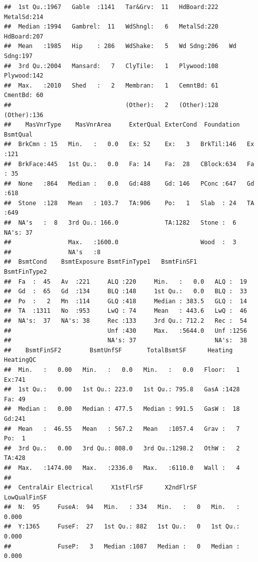 \documentclass[
]{article}
\begin{document}
\begin{verbatim}
##  1st Qu.:1967   Gable  :1141   Tar&Grv:  11   HdBoard:222   MetalSd:214  
##  Median :1994   Gambrel:  11   WdShngl:   6   MetalSd:220   HdBoard:207  
##  Mean   :1985   Hip    : 286   WdShake:   5   Wd Sdng:206   Wd Sdng:197  
##  3rd Qu.:2004   Mansard:   7   ClyTile:   1   Plywood:108   Plywood:142  
##  Max.   :2010   Shed   :   2   Membran:   1   CemntBd: 61   CmentBd: 60  
##                                (Other):   2   (Other):128   (Other):136  
##    MasVnrType    MasVnrArea     ExterQual ExterCond  Foundation  BsmtQual  
##  BrkCmn : 15   Min.   :   0.0   Ex: 52    Ex:   3   BrkTil:146   Ex  :121  
##  BrkFace:445   1st Qu.:   0.0   Fa: 14    Fa:  28   CBlock:634   Fa  : 35  
##  None   :864   Median :   0.0   Gd:488    Gd: 146   PConc :647   Gd  :618  
##  Stone  :128   Mean   : 103.7   TA:906    Po:   1   Slab  : 24   TA  :649  
##  NA's   :  8   3rd Qu.: 166.0             TA:1282   Stone :  6   NA's: 37  
##                Max.   :1600.0                       Wood  :  3             
##                NA's   :8                                                   
##  BsmtCond    BsmtExposure BsmtFinType1   BsmtFinSF1     BsmtFinType2
##  Fa  :  45   Av  :221     ALQ :220     Min.   :   0.0   ALQ :  19   
##  Gd  :  65   Gd  :134     BLQ :148     1st Qu.:   0.0   BLQ :  33   
##  Po  :   2   Mn  :114     GLQ :418     Median : 383.5   GLQ :  14   
##  TA  :1311   No  :953     LwQ : 74     Mean   : 443.6   LwQ :  46   
##  NA's:  37   NA's: 38     Rec :133     3rd Qu.: 712.2   Rec :  54   
##                           Unf :430     Max.   :5644.0   Unf :1256   
##                           NA's: 37                      NA's:  38   
##    BsmtFinSF2        BsmtUnfSF       TotalBsmtSF      Heating     HeatingQC
##  Min.   :   0.00   Min.   :   0.0   Min.   :   0.0   Floor:   1   Ex:741   
##  1st Qu.:   0.00   1st Qu.: 223.0   1st Qu.: 795.8   GasA :1428   Fa: 49   
##  Median :   0.00   Median : 477.5   Median : 991.5   GasW :  18   Gd:241   
##  Mean   :  46.55   Mean   : 567.2   Mean   :1057.4   Grav :   7   Po:  1   
##  3rd Qu.:   0.00   3rd Qu.: 808.0   3rd Qu.:1298.2   OthW :   2   TA:428   
##  Max.   :1474.00   Max.   :2336.0   Max.   :6110.0   Wall :   4            
##                                                                            
##  CentralAir Electrical     X1stFlrSF      X2ndFlrSF     LowQualFinSF    
##  N:  95     FuseA:  94   Min.   : 334   Min.   :   0   Min.   :  0.000  
##  Y:1365     FuseF:  27   1st Qu.: 882   1st Qu.:   0   1st Qu.:  0.000  
##             FuseP:   3   Median :1087   Median :   0   Median :  0.000  

\end{verbatim}
\end{document}
